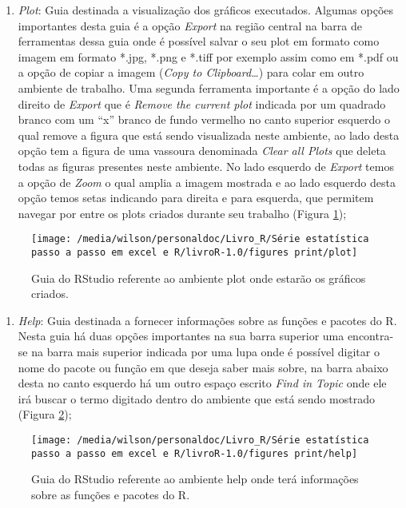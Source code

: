 \documentclass[14pt,titlepage, oneside, openany, a4paper]{book}
\providecommand{\tightlist}{%
  \setlength{\itemsep}{0pt}\setlength{\parskip}{0pt}}
\begin{document}
\begin{enumerate}
\def\labelenumi{\arabic{enumi}.}
\setcounter{enumi}{6}
\tightlist
\item
  \emph{Plot}: Guia destinada a visualização dos gráficos executados. Algumas opções importantes desta guia é a opção \emph{Export} na região central na barra de ferramentas dessa guia onde é possível salvar o seu plot em formato como imagem em formato *.jpg, *.png e *.tiff por exemplo assim como em *.pdf ou a opção de copiar a imagem (\emph{Copy to Clipboard\ldots{}}) para colar em outro ambiente de trabalho. Uma segunda ferramenta importante é a opção do lado direito de \emph{Export} que é \emph{Remove the current plot} indicada por um quadrado branco com um ``x'' branco de fundo vermelho no canto superior esquerdo o qual remove a figura que está sendo visualizada neste ambiente, ao lado desta opção tem a figura de uma vassoura denominada \emph{Clear all Plots} que deleta todas as figuras presentes neste ambiente. No lado esquerdo de \emph{Export} temos a opção de \emph{Zoom} o qual amplia a imagem mostrada e ao lado esquerdo desta opção temos setas indicando para direita e para esquerda, que permitem navegar por entre os plots criados durante seu trabalho (Figura \ref{fig:plot});
\end{enumerate}

\begin{figure}[H]
\texttt{[image: /media/wilson/personaldoc/Livro\_R/Série estatística passo a passo em excel e R/livroR-1.0/figures print/plot]} \caption{Guia do RStudio referente ao ambiente plot onde estarão os gráficos criados.}\label{fig:plot}
\end{figure}

\begin{enumerate}
\def\labelenumi{\arabic{enumi}.}
\setcounter{enumi}{7}
\tightlist
\item
  \emph{Help}: Guia destinada a fornecer informações sobre as funções e pacotes do R. Nesta guia há duas opções importantes na sua barra superior uma encontra-se na barra mais superior indicada por uma lupa onde é possível digitar o nome do pacote ou função em que deseja saber mais sobre, na barra abaixo desta no canto esquerdo há um outro espaço escrito \emph{Find in Topic} onde ele irá buscar o termo digitado dentro do ambiente que está sendo mostrado (Figura \ref{fig:help});
\end{enumerate}

\begin{figure}[H]
\texttt{[image: /media/wilson/personaldoc/Livro\_R/Série estatística passo a passo em excel e R/livroR-1.0/figures print/help]} \caption{Guia do RStudio referente ao ambiente help onde terá informações sobre as funções e pacotes do R.}\label{fig:help}
\end{figure}
\end{document}
